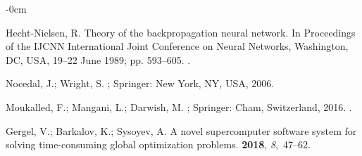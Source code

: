 \documentclass[mathematics,article,accept,pdftex,moreauthors]{Definitions/mdpi}
\begin{document}
\begin{adjustwidth}{-\extralength}{0cm}
\begin{thebibliography}{999}
Hecht-Nielsen, R.
\newblock Theory of the backpropagation neural network.
\newblock In Proceedings of the   IJCNN International Joint Conference on Neural Networks, Washington, DC, USA, 19--22 June 1989;  pp. 593--605.
.

Nocedal, J.; Wright, S.
; Springer: New York, NY, USA,  2006.

Moukalled, F.; Mangani, L.;  {Darwish, M}.
; Springer:   Cham, Switzerland, 
  2016.
.

Gergel, V.; Barkalov, K.; Sysoyev, A.
\newblock A novel supercomputer software system for solving time-consuming
  global optimization problems.
 {\bf 2018}, {\em
  8},~47--62.

\end{thebibliography}




\end{adjustwidth}
\end{document}
